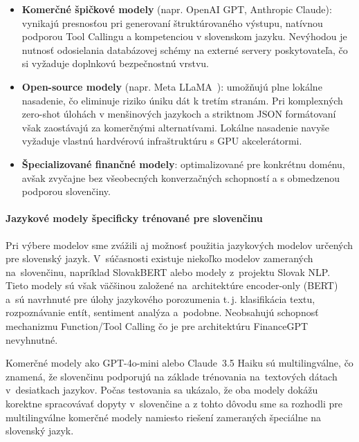 \begin{itemize}
	\item \textbf{Komerčné špičkové modely} (napr. OpenAI GPT, Anthropic Claude): vynikajú
		presnosťou pri generovaní štruktúrovaného výstupu, natívnou podporou Tool
		Callingu a kompetenciou v slovenskom jazyku. Nevýhodou je nutnosť odosielania
		databázovej schémy na externé servery poskytovateľa, čo si vyžaduje
		doplnkovú bezpečnostnú vrstvu.

	\item \textbf{Open-source modely} (napr. Meta LLaMA~\cite{touvron2023llama}):
		umožňujú plne lokálne %
		nasadenie, čo eliminuje riziko úniku dát k tretím stranám. Pri komplexných zero-shot
		úlohách v menšinových jazykoch a striktnom JSON formátovaní však zaostávajú za
		komerčnými alternatívami. Lokálne nasadenie navyše vyžaduje vlastnú
		hardvérovú infraštruktúru s GPU akcelerátormi.

	\item \textbf{Špecializované finančné modely}: optimalizované pre konkrétnu doménu,
		avšak zvyčajne bez všeobecných konverzačných schopností a s obmedzenou
		podporou slovenčiny.
\end{itemize}

\paragraph{Jazykové modely špecificky trénované pre slovenčinu}

Pri výbere modelov sme zvážili aj možnosť použitia jazykových modelov určených
pre slovenský jazyk. V~súčasnosti existuje niekoľko modelov zameraných na~slovenčinu,
napríklad SlovakBERT alebo modely z~projektu Slovak NLP. Tieto modely sú však väčšinou
založené na~architektúre encoder-only (BERT) a~sú navrhnuté pre úlohy jazykového porozumenia
t.\,j. klasifikácia textu, rozpoznávanie entít, sentiment analýza a~podobne.
Neobsahujú schopnosť mechanizmu Function/Tool Calling čo je pre architektúru
FinanceGPT nevyhnutné.

Komerčné modely ako GPT-4o-mini alebo Claude~3.5 Haiku sú multilingválne, čo znamená,
že slovenčinu podporujú na základe trénovania na~textových dátach v~desiatkach
jazykov. Počas testovania sa ukázalo, že oba modely dokážu korektne spracovávať
dopyty v~slovenčine a z tohto dôvodu sme sa rozhodli pre multilingválne komerčné
modely namiesto riešení zameraných špeciálne na slovenský jazyk.

\vspace{1\baselineskip}
\vspace{1\baselineskip}
\vspace{1\baselineskip}
